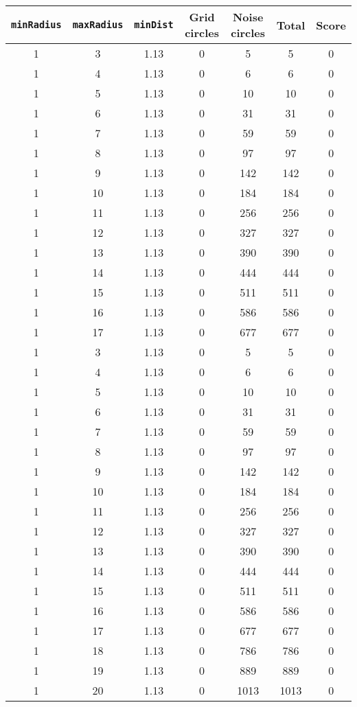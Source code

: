 \documentclass[letterpaper, 12pt]{article}
\begin{document}
\begin{longtable}{|c|c|c|c|c|c|c|}
\hline
\textbf{\texttt{minRadius}} & \textbf{\texttt{maxRadius}} & \textbf{\texttt{minDist}} & \textbf{Grid circles} & \textbf{Noise circles} & \textbf{Total} & \textbf{Score} \\
\hline
1 & 3 & 1.13 & 0 & 5 & 5 & 0 \\
\hline
1 & 4 & 1.13 & 0 & 6 & 6 & 0 \\
\hline
1 & 5 & 1.13 & 0 & 10 & 10 & 0 \\
\hline
1 & 6 & 1.13 & 0 & 31 & 31 & 0 \\
\hline
1 & 7 & 1.13 & 0 & 59 & 59 & 0 \\
\hline
1 & 8 & 1.13 & 0 & 97 & 97 & 0 \\
\hline
1 & 9 & 1.13 & 0 & 142 & 142 & 0 \\
\hline
1 & 10 & 1.13 & 0 & 184 & 184 & 0 \\
\hline
1 & 11 & 1.13 & 0 & 256 & 256 & 0 \\
\hline
1 & 12 & 1.13 & 0 & 327 & 327 & 0 \\
\hline
1 & 13 & 1.13 & 0 & 390 & 390 & 0 \\
\hline
1 & 14 & 1.13 & 0 & 444 & 444 & 0 \\
\hline
1 & 15 & 1.13 & 0 & 511 & 511 & 0 \\
\hline
1 & 16 & 1.13 & 0 & 586 & 586 & 0 \\
\hline
1 & 17 & 1.13 & 0 & 677 & 677 & 0 \\
\hline
1 & 3 & 1.13 & 0 & 5 & 5 & 0 \\
\hline
1 & 4 & 1.13 & 0 & 6 & 6 & 0 \\
\hline
1 & 5 & 1.13 & 0 & 10 & 10 & 0 \\
\hline
1 & 6 & 1.13 & 0 & 31 & 31 & 0 \\
\hline
1 & 7 & 1.13 & 0 & 59 & 59 & 0 \\
\hline
1 & 8 & 1.13 & 0 & 97 & 97 & 0 \\
\hline
1 & 9 & 1.13 & 0 & 142 & 142 & 0 \\
\hline
1 & 10 & 1.13 & 0 & 184 & 184 & 0 \\
\hline
1 & 11 & 1.13 & 0 & 256 & 256 & 0 \\
\hline
1 & 12 & 1.13 & 0 & 327 & 327 & 0 \\
\hline
1 & 13 & 1.13 & 0 & 390 & 390 & 0 \\
\hline
1 & 14 & 1.13 & 0 & 444 & 444 & 0 \\
\hline
1 & 15 & 1.13 & 0 & 511 & 511 & 0 \\
\hline
1 & 16 & 1.13 & 0 & 586 & 586 & 0 \\
\hline
1 & 17 & 1.13 & 0 & 677 & 677 & 0 \\
\hline
1 & 18 & 1.13 & 0 & 786 & 786 & 0 \\
\hline
1 & 19 & 1.13 & 0 & 889 & 889 & 0 \\
\hline
1 & 20 & 1.13 & 0 & 1013 & 1013 & 0 \\
\hline
\end{longtable}
\end{document}
